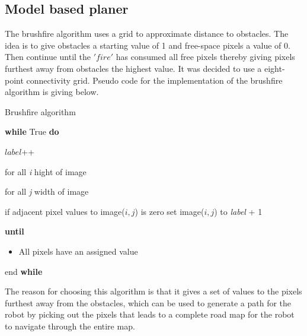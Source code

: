 \documentclass[../Head/Main.tex]{subfiles}
\begin{document}
\subsection{Model based planer}

The brushfire algorithm uses a grid to approximate distance to obstacles. The idea is to give obstacles a starting value of 1 and free-space pixels a value of 0. Then continue until the $'fire'$ has consumed all free pixels thereby giving pixels furthest away from obstacles the highest value. It was decided to use a eight-point connectivity grid. Pseudo code for the implementation of the brushfire algorithm is giving below.          

\begin{Pseudo}{Brushfire algorithm}{}

	\textbf{while} True \textbf{do}
	

	\begin{Indentation}
	\item $label$++
	\begin{Indentation}

	\item for all \textit{i} hight of image 
	\begin{Indentation}
	\item for all \textit{j} width of image 
	\item if adjacent pixel values to image($i, j $) is zero set image($i, j $) to \textit{label} + 1	
	
	\end{Indentation}
	
	\item \textbf{until}
				
	\begin{itemize}
	\item All pixels have an assigned value 
	\end{itemize}

	\end{Indentation}
	
	 \item end \textbf{while}

	\end{Indentation}
	
\end{Pseudo}

The reason for choosing this algorithm is that it gives a set of values to the pixels furthest away from the obstacles, which can be used to generate a path for the robot by picking out the pixels that leads to a complete road map for the robot to navigate through the entire map. 
\end{document}
